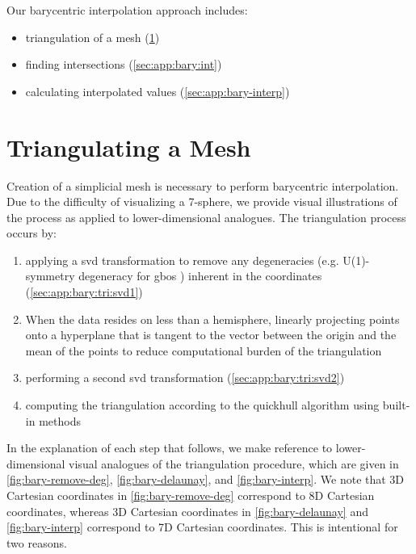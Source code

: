 \documentclass[final,12pt]{elsarticle}
\begin{document}
Our barycentric interpolation approach includes:
\begin{itemize}%
	\item[1.] triangulation of a mesh (\cref{sec:app:bary:tri})
	\item[2.] finding intersections (\cref{sec:app:bary:int})
	\item[3.] calculating interpolated values (\cref{sec:app:bary-interp})
\end{itemize}

\section{Triangulating a Mesh}
\label{sec:app:bary:tri}

Creation of a simplicial mesh is necessary to perform barycentric interpolation. Due to the difficulty of visualizing a 7-sphere, we provide visual illustrations of the process as applied to lower-dimensional analogues. The triangulation process occurs by:
\begin{enumerate}%
	\item[1.1] applying a \gls{svd} transformation to remove any degeneracies (e.g. U(1)-symmetry degeneracy for \glspl{gbo} \cite{francisGeodesicOctonionMetric2019}) inherent in the coordinates (\cref{sec:app:bary:tri:svd1})
	\item[1.2] When the data resides on less than a hemisphere, linearly projecting points onto a hyperplane that is tangent to the vector between the origin and the mean of the \inpt{} points to reduce computational burden of the triangulation
	\item[1.3] performing a second \gls{svd} transformation (\cref{sec:app:bary:tri:svd2})
	\item[1.4] computing the triangulation according to the quickhull algorithm \cite{barberQuickhullAlgorithmConvex1996} using built-in methods
\end{enumerate}

In the explanation of each step that follows, we make reference to lower-dimensional visual analogues of the triangulation procedure, which are given in \cref{fig:bary-remove-deg}, \cref{fig:bary-delaunay}, and \cref{fig:bary-interp}. We note that 3D Cartesian coordinates in \cref{fig:bary-remove-deg} correspond to 8D Cartesian coordinates, whereas 3D Cartesian coordinates in \cref{fig:bary-delaunay} and \cref{fig:bary-interp} correspond to 7D Cartesian coordinates. This is intentional for two reasons.
\end{document}
